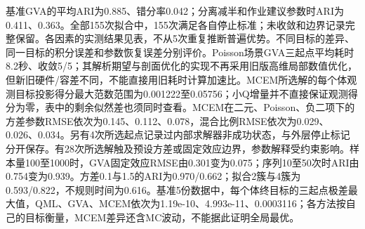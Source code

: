 基准GVA的平均ARI为0.885、错分率0.042；分离减半和作业建议参数时ARI为0.411、0.363。全部155次拟合中，155次满足各自停止标准；未收敛和边界记录完整保留。各因素的实测结果见表，不从5次重复推断普遍优势。不同目标的差异、同一目标的积分误差和参数恢复误差分别评价。Poisson场景GVA三起点平均耗时8.2秒、收敛5/5；其解析期望与剖面优化的实现不再采用旧版高维局部数值优化，但新旧硬件/容差不同，不能直接用旧耗时计算加速比。MCEM所选解的每个体观测目标投影得分最大范数范围为0.001222至0.05756；小Q增量并不直接保证观测得分为零，表中的剩余似然差也须同时查看。MCEM在二元、Poisson、负二项下的方差参数RMSE依次为0.145、0.112、0.078，混合比例RMSE依次为0.029、0.026、0.034。另有4次所选起点记录过内部求解器非成功状态，与外层停止标记分开保存。有28次所选解触及预设方差或固定效应边界，参数解释受约束影响。样本量100至1000时，GVA固定效应RMSE由0.301变为0.075；序列10至50次时ARI由0.754变为0.939。方差0.1与1.5的ARI为0.970/0.662；拟合2簇与4簇为0.593/0.822，不规则时间为0.616。基准5份数据中，每个体终目标的三起点极差最大值，QML、GVA、MCEM依次为1.19e-10、4.993e-11、0.0003116；各方法按自己的目标衡量，MCEM差异还含MC波动，不能据此证明全局最优。